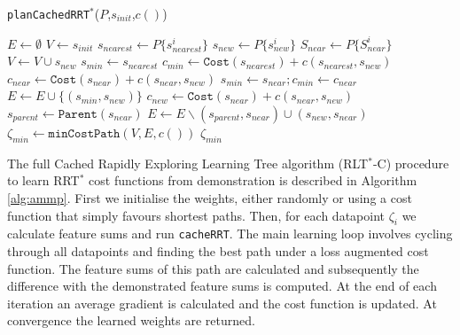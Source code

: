 \documentclass{article}  %
\begin{document}
	\begin{algorithm}
  	\scriptsize
	\caption{\texttt{planCachedRRT$^*$}($P$,$s_{init}$,$c()$)}
	 \label{alg:plan_cached}
	\begin{algorithmic}[1]
	\STATE $E \gets \emptyset$
	\STATE $V \gets {s_{init}}$
	\STATE $s_{nearest} \gets P\{s_{nearest}^i\}$
	\STATE $s_{new} \gets P\{s_{new}^i\}$
	\STATE $S_{near} \gets P\{S_{near}^i\}$
	\STATE $V\gets V \cup s_{new}$
	\STATE $s_{min}\gets s_{nearest}$
	\STATE $c_{min}\gets \texttt{Cost}(s_{nearest}) + c(s_{nearest},s_{new})$
	\STATE $c_{near} \gets \texttt{Cost}(s_{near}) + c(s_{near},s_{new})$
	\STATE $s_{min} \gets s_{near}; c_{min}\gets c_{near}$
	\ENDIF
	\ENDFOR
	\STATE $E \gets E \cup \{(s_{min},s_{new})\} $
	\STATE $c_{new} \gets \texttt{Cost}(s_{near}) + c(s_{near},s_{new})$
	\STATE $s_{parent} \gets \texttt{Parent}(s_{near})$
	\STATE $E \gets E  \smallsetminus {(s_{parent},s_{near})} \cup {(s_{new},s_{near})} $
	\ENDIF
	\ENDFOR
	\ENDFOR
	\STATE $\zeta_{min} \gets \texttt{minCostPath}(V,E,c())$
	\RETURN $\zeta_{min}$

	\end{algorithmic}
	\end{algorithm}

	The full Cached Rapidly Exploring Learning Tree algorithm (RLT$^*$-C) procedure to learn RRT$^*$ cost functions from demonstration is described in Algorithm \ref{alg:ammp}. First we initialise the weights, either randomly or using a cost function that simply favours shortest paths. Then, for each datapoint $\zeta_i$ we calculate feature sums and run \texttt{cacheRRT}. The main learning loop involves cycling through all datapoints and finding the best path under a loss augmented cost function. The feature sums of this path are calculated and subsequently the difference with the demonstrated feature sums is computed. At the end of each iteration an average gradient is calculated and the cost function is updated. At convergence the learned weights are returned.
\end{document}

